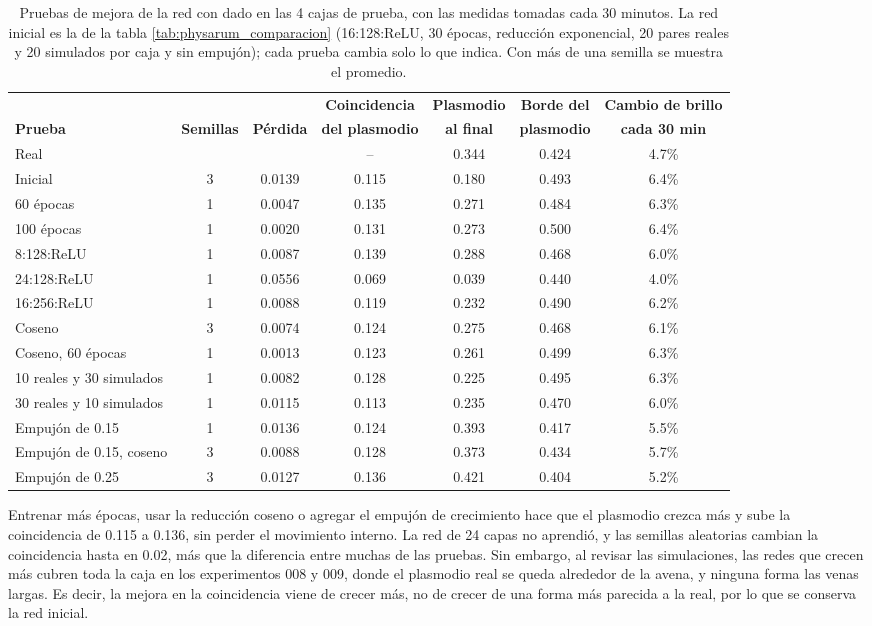 \begin{table}[htbp]
	\centering
	\footnotesize
	\setlength{\tabcolsep}{4pt}
	\begin{tabular}{@{}lcccccc@{}}
		\toprule
		& & & \textbf{Coincidencia} & \textbf{Plasmodio} & \textbf{Borde del} & \textbf{Cambio de brillo} \\
		\textbf{Prueba} & \textbf{Semillas} & \textbf{Pérdida} & \textbf{del plasmodio} & \textbf{al final} & \textbf{plasmodio} & \textbf{cada 30 min} \\ \midrule
		Real & & & -- & 0.344 & 0.424 & 4.7\% \\ \midrule
		Inicial & 3 & 0.0139 & 0.115 & 0.180 & 0.493 & 6.4\% \\
		60 épocas & 1 & 0.0047 & 0.135 & 0.271 & 0.484 & 6.3\% \\
		100 épocas & 1 & 0.0020 & 0.131 & 0.273 & 0.500 & 6.4\% \\
		8:128:ReLU & 1 & 0.0087 & 0.139 & 0.288 & 0.468 & 6.0\% \\
		24:128:ReLU & 1 & 0.0556 & 0.069 & 0.039 & 0.440 & 4.0\% \\
		16:256:ReLU & 1 & 0.0088 & 0.119 & 0.232 & 0.490 & 6.2\% \\
		Coseno & 3 & 0.0074 & 0.124 & 0.275 & 0.468 & 6.1\% \\
		Coseno, 60 épocas & 1 & 0.0013 & 0.123 & 0.261 & 0.499 & 6.3\% \\
		10 reales y 30 simulados & 1 & 0.0082 & 0.128 & 0.225 & 0.495 & 6.3\% \\
		30 reales y 10 simulados & 1 & 0.0115 & 0.113 & 0.235 & 0.470 & 6.0\% \\
		Empujón de 0.15 & 1 & 0.0136 & 0.124 & 0.393 & 0.417 & 5.5\% \\
		Empujón de 0.15, coseno & 3 & 0.0088 & 0.128 & 0.373 & 0.434 & 5.7\% \\
		Empujón de 0.25 & 3 & 0.0127 & 0.136 & 0.421 & 0.404 & 5.2\% \\
		\bottomrule
	\end{tabular}
	\caption{Pruebas de mejora de la red con dado en las 4 cajas de prueba, con las medidas tomadas cada 30 minutos. La red inicial es la de la tabla \ref{tab:physarum_comparacion} (16:128:ReLU, 30 épocas, reducción exponencial, 20 pares reales y 20 simulados por caja y sin empujón); cada prueba cambia solo lo que indica. Con más de una semilla se muestra el promedio.}
	\label{tab:physarum_mejoras}
\end{table}

Entrenar más épocas, usar la reducción coseno o agregar el empujón de crecimiento hace que el plasmodio crezca más y sube la coincidencia de 0.115 a 0.136, sin perder el movimiento interno. La red de 24 capas no aprendió, y las semillas aleatorias cambian la coincidencia hasta en 0.02, más que la diferencia entre muchas de las pruebas. Sin embargo, al revisar las simulaciones, las redes que crecen más cubren toda la caja en los experimentos 008 y 009, donde el plasmodio real se queda alrededor de la avena, y ninguna forma las venas largas. Es decir, la mejora en la coincidencia viene de crecer más, no de crecer de una forma más parecida a la real, por lo que se conserva la red inicial.

